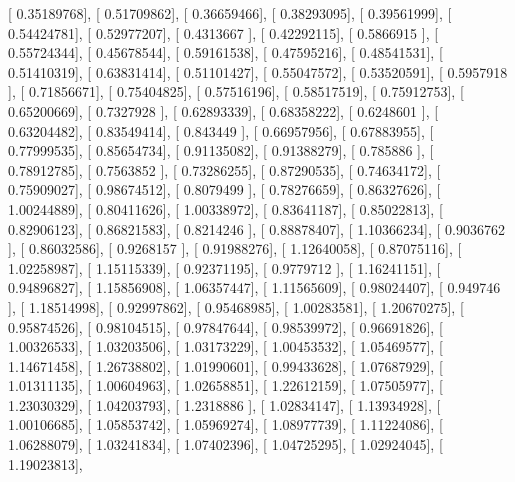 \documentclass{article}
\begin{document}
       [ 0.35189768],
       [ 0.51709862],
       [ 0.36659466],
       [ 0.38293095],
       [ 0.39561999],
       [ 0.54424781],
       [ 0.52977207],
       [ 0.4313667 ],
       [ 0.42292115],
       [ 0.5866915 ],
       [ 0.55724344],
       [ 0.45678544],
       [ 0.59161538],
       [ 0.47595216],
       [ 0.48541531],
       [ 0.51410319],
       [ 0.63831414],
       [ 0.51101427],
       [ 0.55047572],
       [ 0.53520591],
       [ 0.5957918 ],
       [ 0.71856671],
       [ 0.75404825],
       [ 0.57516196],
       [ 0.58517519],
       [ 0.75912753],
       [ 0.65200669],
       [ 0.7327928 ],
       [ 0.62893339],
       [ 0.68358222],
       [ 0.6248601 ],
       [ 0.63204482],
       [ 0.83549414],
       [ 0.843449  ],
       [ 0.66957956],
       [ 0.67883955],
       [ 0.77999535],
       [ 0.85654734],
       [ 0.91135082],
       [ 0.91388279],
       [ 0.785886  ],
       [ 0.78912785],
       [ 0.7563852 ],
       [ 0.73286255],
       [ 0.87290535],
       [ 0.74634172],
       [ 0.75909027],
       [ 0.98674512],
       [ 0.8079499 ],
       [ 0.78276659],
       [ 0.86327626],
       [ 1.00244889],
       [ 0.80411626],
       [ 1.00338972],
       [ 0.83641187],
       [ 0.85022813],
       [ 0.82906123],
       [ 0.86821583],
       [ 0.8214246 ],
       [ 0.88878407],
       [ 1.10366234],
       [ 0.9036762 ],
       [ 0.86032586],
       [ 0.9268157 ],
       [ 0.91988276],
       [ 1.12640058],
       [ 0.87075116],
       [ 1.02258987],
       [ 1.15115339],
       [ 0.92371195],
       [ 0.9779712 ],
       [ 1.16241151],
       [ 0.94896827],
       [ 1.15856908],
       [ 1.06357447],
       [ 1.11565609],
       [ 0.98024407],
       [ 0.949746  ],
       [ 1.18514998],
       [ 0.92997862],
       [ 0.95468985],
       [ 1.00283581],
       [ 1.20670275],
       [ 0.95874526],
       [ 0.98104515],
       [ 0.97847644],
       [ 0.98539972],
       [ 0.96691826],
       [ 1.00326533],
       [ 1.03203506],
       [ 1.03173229],
       [ 1.00453532],
       [ 1.05469577],
       [ 1.14671458],
       [ 1.26738802],
       [ 1.01990601],
       [ 0.99433628],
       [ 1.07687929],
       [ 1.01311135],
       [ 1.00604963],
       [ 1.02658851],
       [ 1.22612159],
       [ 1.07505977],
       [ 1.23030329],
       [ 1.04203793],
       [ 1.2318886 ],
       [ 1.02834147],
       [ 1.13934928],
       [ 1.00106685],
       [ 1.05853742],
       [ 1.05969274],
       [ 1.08977739],
       [ 1.11224086],
       [ 1.06288079],
       [ 1.03241834],
       [ 1.07402396],
       [ 1.04725295],
       [ 1.02924045],
       [ 1.19023813],
\end{document}

